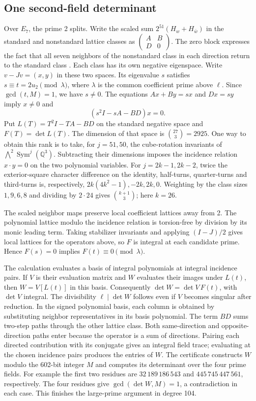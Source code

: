 \documentclass[11pt,a4paper]{article}
\newcommand{\Q}{\mathbb Q}
\begin{document}
\subsection{One second-field determinant}
Over \(E_7\), the prime 2 splits. Write the scaled sum
\(2^{51}(H_w+H_{\bar w})\) in the standard and nonstandard lattice
classes as \(\left(\begin{smallmatrix}A&B\\D&0\end{smallmatrix}\right)\).
The zero block expresses the fact that all seven neighbors of the
nonstandard class in each direction return to the standard class
\cite[\S3]{loeffler}. Each class has its own negative eigenspace.
Write \(v-Jv=(x,y)\) in these two spaces. Its eigenvalue \(s\) satisfies
\(s\equiv t=2u_2\pmod\lambda\), where \(\lambda\) is the common
coefficient prime above \(\ell\). Since \(\gcd(t,M)=1\), we have \(s\ne0\).
The equations \(Ax+By=sx\) and \(Dx=sy\) imply \(x\ne0\) and
\[
 (s^2I-sA-BD)x=0 .
\]
Put \(L(T)=T^2I-TA-BD\) on the standard negative space and
\(F(T)=\det L(T)\). The dimension of that space is \(\binom{27}{3}=2925\). One way
to obtain this rank is to take, for \(j=51,50\), the cube-rotation
invariants of \(\bigwedge^2\operatorname{Sym}^j(\Q^3)\).
Subtracting their dimensions imposes the incidence relation \(x\cdot y=0\)
on the two polynomial variables. For \(j=2k-1,2k-2\), twice the exterior-square character
difference on the identity, half-turns, quarter-turns and third-turns is,
respectively, \(2k(4k^2-1),-2k,2k,0\).
Weighting by the class sizes \(1,9,6,8\) and dividing by \(2\cdot24\) gives \(\binom{k+1}{3}\);
here \(k=26\).

The scaled neighbor maps preserve local coefficient lattices away from 2.
The polynomial lattice modulo the incidence relation is torsion-free
by division by its monic leading term. Taking stabilizer invariants and
applying \((I-J)/2\) gives local lattices for the operators above, so
\(F\) is integral at each candidate prime. Hence \(F(s)=0\) implies
\(F(t)\equiv0\pmod\lambda\).

The calculation evaluates a basis of integral polynomials at integral
incidence pairs. If \(V\) is their evaluation matrix and \(W\) evaluates
their images under \(L(t)\), then \(W=V[L(t)]\) in this basis.
Consequently \(\det W=\det V\,F(t)\), with \(\det V\) integral. The
divisibility \(\ell\mid\det W\) follows even if \(V\) becomes singular
after reduction. In the signed polynomial basis, each column is obtained by substituting neighbor representatives in its basis polynomial. The term \(BD\) sums two-step paths through the other lattice class. Both same-direction and opposite-direction paths enter because the operator is a sum of directions. Pairing each directed contribution with its conjugate gives an integral field trace; evaluating at the chosen incidence pairs produces the entries of \(W\). The certificate constructs \(W\) modulo the 602-bit
integer \(M\) and computes its determinant over the four prime fields.
For example the first two residues are \(32\,189\,186\,543\) and
\(445\,745\,447\,561\), respectively. The four residues give
\(\gcd(\det W,M)=1\), a contradiction in each case. This finishes the
large-prime argument in degree 104.
\end{document}
